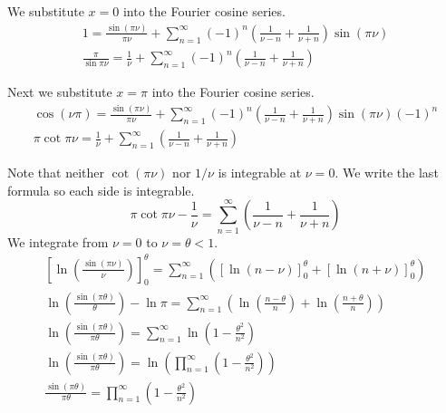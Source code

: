 {\begin{Solution}
  We substitute $x = 0$ into the Fourier cosine series.
  \begin{gather*}
    1 = \frac{\sin(\pi \nu)}{\pi \nu} 
    + \sum_{n = 1}^\infty (-1)^n \left( \frac{1}{\nu - n} + \frac{1}{\nu + n} \right) \sin(\pi \nu)
    \\
    \boxed{
      \frac{\pi}{\sin \pi \nu} = \frac{1}{\nu} 
      + \sum_{n = 1}^\infty (-1)^n \left( \frac{1}{\nu - n} + \frac{1}{\nu + n} \right)
      }
  \end{gather*}

  Next we substitute $x = \pi$ into the Fourier cosine series.
  \begin{gather*}
    \cos(\nu \pi) = \frac{\sin(\pi \nu)}{\pi \nu} 
    + \sum_{n = 1}^\infty (-1)^n \left( \frac{1}{\nu - n} + \frac{1}{\nu + n} \right) 
    \sin(\pi \nu) (-1)^n 
    \\
    \boxed{
      \pi \cot \pi \nu = \frac{1}{\nu}  
      + \sum_{n = 1}^\infty \left( \frac{1}{\nu - n } + \frac{1}{\nu + n} \right)
      }
  \end{gather*}

  Note that neither $\cot(\pi \nu)$ nor $1 / \nu$ is integrable at $\nu = 0$.
  We write the last formula so each side is integrable.
  \[
  \pi \cot \pi \nu - \frac{1}{\nu} 
  = \sum_{n = 1}^\infty \left( \frac{1}{\nu - n } + \frac{1}{\nu + n} \right)
  \]
  We integrate from $\nu = 0$ to $\nu = \theta < 1$.
  \begin{gather*}
    \left[ \ln \left( \frac{\sin(\pi \nu)}{\nu} \right) \right]_0^\theta
    = \sum_{n = 1}^\infty \left( \left[ \ln(n - \nu) \right]_0^\theta
      + \left[ \ln(n + \nu) \right]_0^\theta \right) 
    \\
    \ln \left( \frac{\sin(\pi \theta)}{\theta} \right) - \ln \pi
    = \sum_{n = 1}^\infty \left( \ln \left( \frac{n - \theta}{n} \right)
      + \ln \left( \frac{n + \theta}{n} \right) \right) 
    \\
    \ln \left( \frac{\sin(\pi \theta)}{\pi \theta} \right)
    = \sum_{n = 1}^\infty \ln \left( 1 - \frac{\theta^2}{n^2} \right) 
    \\
    \ln \left( \frac{\sin(\pi \theta)}{\pi \theta} \right)
    = \ln \left( \prod_{n=1}^\infty \left( 1 - \frac{\theta^2}{n^2} \right) \right) 
    \\
    \boxed{
      \frac{\sin(\pi \theta)}{\pi \theta} = \prod_{n=1}^\infty \left( 1 - \frac{\theta^2}{n^2} \right)
      }
  \end{gather*}
\end{Solution}





}
